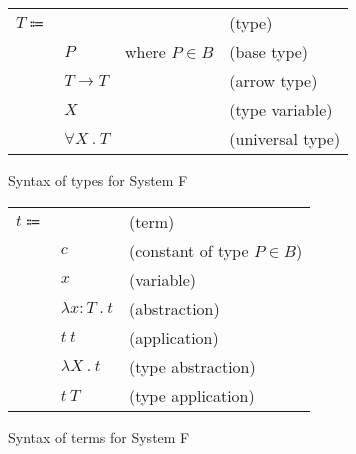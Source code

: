 \documentclass[acmlarge]{acmart}
\begin{document}
  \newcommand\labs[2]{\lambda #1 \ . \ #2}
  \newcommand\lapp[2]{#1 \ #2}
  \newcommand\lsub[3]{#1 \left[ #2 \mapsto #3 \right]}

  \newcommand\evalsto[2]{#1 \longrightarrow #2}

  \newcommand\tarrow[2]{#1 \rightarrow #2}
  \newcommand\tforall[2]{\forall #1 \ . \ #2}

  \begin{figure}[h!]
    \begin{mdframed}

      \begin{tabular}{l l l l}
        $T \Coloneqq $ & & & (type) \\
        & $P$ & where $P \in B$ & (base type) \\
        & $T \rightarrow T$ & & (arrow type) \\
        & $X$ & & (type variable) \\
        & $\tforall{X}{T}$ & & (universal type) \\
      \end{tabular}

    \end{mdframed}
    \caption{Syntax of types for System F}
    \label{fig:system_f_types_syntax}
  \end{figure}

  \begin{figure}[h!]
    \begin{mdframed}

      \begin{tabular}{l l l}
        $t \Coloneqq $ & & (term) \\
        & $c$ & (constant of type $P \in B$) \\
        & $x$ & (variable) \\
        & $\labs{x : T}{t}$ & (abstraction) \\
        & $\lapp{t}{t}$ & (application) \\
        & $\labs{X}{t}$ & (type abstraction) \\
        & $\lapp{t}{T}$ & (type application)
      \end{tabular}

    \end{mdframed}
    \caption{Syntax of terms for System F}
    \label{fig:system_f_terms_syntax}
  \end{figure}
\end{document}
